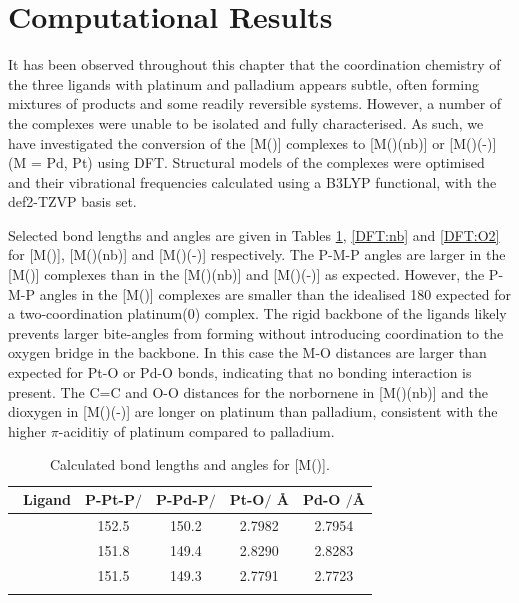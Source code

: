 
\section{Computational Results}

It has been observed throughout this chapter that the coordination chemistry of the three \tBuxantphos{} ligands with platinum and palladium appears subtle, often forming mixtures of products and some readily reversible systems.  However, a number of the complexes were unable to be isolated and fully characterised.  As such, we have investigated the conversion of the [M(\tBuxantphos)] complexes to [M(\tBuxantphos)(nb)] or [M(\tBuxantphos)(-)] (M = Pd, Pt) using \gls{DFT}.  Structural models of the complexes were optimised and their vibrational frequencies calculated using a B3LYP functional,\cite{Becke1993, Lee1988, Vosko1980, Stephens1994} with the def2-TZVP basis set.\cite{Andrae1990, Weigend2005}  

Selected bond lengths and angles are given in Tables \ref{DFT:14}, \ref{DFT:nb} and \ref{DFT:O2} for [M(\tBuxantphos)], [M(\tBuxantphos)(nb)] and [M(\tBuxantphos)(-)] respectively.  The P-M-P angles are larger in the [M(\tBuxantphos)] complexes than in the [M(\tBuxantphos)(nb)] and [M(\tBuxantphos)(-)] as expected.  However, the P-M-P angles in the [M(\tBuxantphos)] complexes are smaller than the idealised 180\degrees{} expected for a two-coordination platinum(0) complex.  The rigid backbone of the \tBuxantphos{} ligands likely prevents larger bite-angles from forming without introducing coordination to the oxygen bridge in the backbone.  In this case the M-O distances are larger than expected for Pt-O or Pd-O bonds, indicating that no bonding interaction is present.  The C=C and O-O distances for the norbornene in [M(\tBuxantphos)(nb)] and the dioxygen in [M(\tBuxantphos)(-)] are longer on platinum than palladium, consistent with the higher $\pi$-aciditiy of platinum compared to palladium.\cite{Chianese2007}


\begin{table}[htbp]
\caption[Calculated bond lengths and angles for [M(\tBuxantphos){]}]{Calculated bond lengths and angles for [M(\tBuxantphos){]}.}
\vspace{1em}
\label{DFT:14}
\small
\begin{center}
\begin{tabular}{l c c c c}
	\toprule
	~\bfseries{Ligand} & \bfseries{P-Pt-P$/$\degrees{}} & \bfseries{P-Pd-P$/$\degrees{}} & \bfseries{Pt-O$/$ \si{\angstrom}} & \bfseries{Pd-O $/$\si{\angstrom}}\\
	\midrule		
	~\tBuSixantphos	& 152.5 & 150.2 & 2.7982 & 2.7954\\
	~\tBuThixantphos	& 151.8 & 149.4 & 2.8290 & 2.8283\\
	~\tBuXantphos{}	& 151.5 & 149.3 & 2.7791 & 2.7723\\
	\bottomrule{}
\end{tabular}
\end{center}
\end{table}

